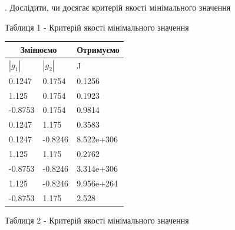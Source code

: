 \documentclass[a4paper]{article}
\begin{document}
\hfill \break
{}. Дослідити, чи досягає критерій якості мінімального значення

\begin{center}
Таблиця 1 - Критерій якості мінімального значення\\
\end{center}

\begin{center}
\begin{tabular}{ |p{3cm}||p{3cm}|p{3cm}| }
 \hline
 \multicolumn{2}{|c|}{Змінюємо} & Отримуємо\\
 \hline
 $|g_{1}|$ & $|g_{2}|$ & J \\
 \hline
 0.1247 & 0.1754 & 0.1256 \\
 1.125 & 0.1754 & 0.1923 \\
 -0.8753 & 0.1754 & 0.9814 \\
 0.1247 & 1.175 & 0.3583 \\
 0.1247 & -0.8246 & 8.522e+306 \\
 1.125 & 1.175 & 0.2762 \\
 -0.8753 & -0.8246 & 3.314e+306 \\
 1.125 & -0.8246 & 9.956e+264 \\
 -0.8753 & 1.175 & 2.528 \\
 \hline
\end{tabular}
\end{center}

\begin{center}
Таблиця 2 - Критерій якості мінімального значення\\
\end{center}
\end{document}
